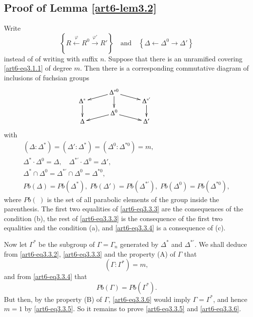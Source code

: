 \subsection{Proof of Lemma \ref{art6-lem3.2}}\label{art6-subsec3.3}
Write
$$
\left\{R \xleftarrow{\varphi} R^0 \xrightarrow{\varphi'} R' \right\} \text{~~ and ~~} \left\{\Delta \longleftarrow \Delta^0 \longrightarrow \Delta' \right\}
$$
instead of \pageoriginale of writing with suffix $n$. Suppose that there is an unramified covering \eqref{art6-eq3.1.1} of degree $m$. Then there is a corresponding commutative diagram of inclusions of fuchsian groups
\setcounter{equation}{0}
\begin{equation}
\vcenter{
\xymatrix@R=-0.05cm@C=1cm{
& \Delta^{\ast 0} \ar[dr] \ar[dl] \ar[ddd] & \\
\Delta^\ast \ar[ddd] &&  \Delta^{\ast'} \ar[ddd]\\
& & &\\
& \Delta^0 \ar[dr]  \ar[dl] & \\
\Delta & & \Delta'}
}\label{art6-eq3.3.1}
\end{equation}
with 
\begin{gather}
(\Delta: \Delta^\ast) = (\Delta' : \Delta^\ast) = (\Delta^0 : \Delta^{\ast 0}) = m, \label{art6-eq3.3.2}\\
\Delta^\ast \cdot \Delta^0 = \Delta, \quad \Delta^{\ast'} \cdot \Delta^0 = \Delta', \tag*{$|$\quad~}\\
\Delta^\ast \cap \Delta^0 = \Delta^{\ast'} \cap \Delta^0 = \Delta^{\ast 0}, \label{art6-eq3.3.3}\\
Pb(\Delta) = Pb (\Delta^\ast), \;Pb (\Delta') = Pb (\Delta^{\ast'}) , \;Pb (\Delta^0) = Pb (\Delta^{\ast 0}), \label{art6-eq3.3.4}
\end{gather}
where $Pb (\;)$ is the set of all parabolic elements of the group inside the parenthesis. The first two equalities of \eqref{art6-eq3.3.3} are the consequences of the condition (b), the rest of \eqref{art6-eq3.3.3} is the consequence of the first two equalities and the condition (a), and \eqref{art6-eq3.3.4} is a consequence of (c).

Now let $\Gamma^\ast$ be the subgroup of $\Gamma = \Gamma_n$ generated by $\Delta^\ast$ and $\Delta^{\ast'}$. We shall deduce from \eqref{art6-eq3.3.2}, \eqref{art6-eq3.3.3} and the property (A) of $\Gamma$ that 
\begin{equation}
(\Gamma: \Gamma^\ast ) = m, \label{art6-eq3.3.5}
\end{equation}
and from \eqref{art6-eq3.3.4} that 
\begin{equation}
Pb (\Gamma) = P b(\Gamma^\ast). \label{art6-eq3.3.6}
\end{equation}
But then, by the property (B) of $\Gamma$, \eqref{art6-eq3.3.6} would imply $\Gamma = \Gamma^\ast$, and hence $m =1$ by \eqref{art6-eq3.3.5}. So it remains to prove \eqref{art6-eq3.3.5} and \eqref{art6-eq3.3.6}. 

